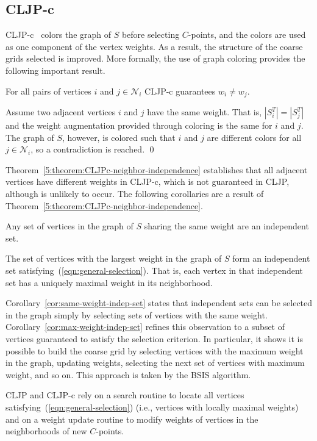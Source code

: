 \documentclass{elsart}
\newenvironment{proof}{\begin{pf}}{\qed\end{pf}}
\begin{document}
\subsection{CLJP-c}
CLJP-c~\cite{alber-cljpc} colors the graph of $S$ before selecting
$C$-points, and the colors are used as one component of the vertex
weights. As a result, the structure of the coarse grids selected is
improved. More formally, the use of graph coloring provides the
following important result.
\begin{thm}
\label{5:theorem:CLJPc-neighbor-independence}
For all pairs of vertices $i$ and $j \in \mathcal{N}_i$ CLJP-c
guarantees $w_i \ne w_j$.
\end{thm}
\begin{proof}
Assume two adjacent vertices $i$ and $j$ have the same weight. That is,
$|S_i^T| = |S_j^T|$ and the weight augmentation provided through
coloring is the same for $i$ and $j$. The graph of $S$, however, is
colored such that $i$ and $j$ are different colors for all $j \in
\mathcal{N}_i$, so a contradiction is reached.
\end{proof}
Theorem~\ref{5:theorem:CLJPc-neighbor-independence} establishes that
all adjacent vertices have different weights in CLJP-c, which is not
guaranteed in CLJP, although is unlikely to occur. The following
corollaries are a result of
Theorem~\ref{5:theorem:CLJPc-neighbor-independence}.
\begin{cor}
\label{cor:same-weight-indep-set}
Any set of vertices in the graph of $S$ sharing the same weight are an
independent set.
\end{cor}
\begin{cor}
\label{cor:max-weight-indep-set}
The set of vertices with the largest weight in the graph of $S$ form
an independent set satisfying~(\ref{eqn:general-selection}). That is,
each vertex in that independent set has a uniquely maximal weight in
its neighborhood.
\end{cor}
Corollary~\ref{cor:same-weight-indep-set} states that independent sets
can be selected in the graph simply by selecting sets of vertices with
the same weight. Corollary~\ref{cor:max-weight-indep-set} refines this
observation to a subset of vertices guaranteed to satisfy the
selection criterion. In particular, it shows it is possible to build
the coarse grid by selecting vertices with the maximum weight in the
graph, updating weights, selecting the next set of vertices with
maximum weight, and so on. This approach is taken by the BSIS
algorithm.

CLJP and CLJP-c rely on a search routine to locate all vertices
satisfying~(\ref{eqn:general-selection}) (i.e., vertices with locally
maximal weights) and on a weight update routine to modify weights of
vertices in the neighborhoods of new $C$-points.
\end{document}
